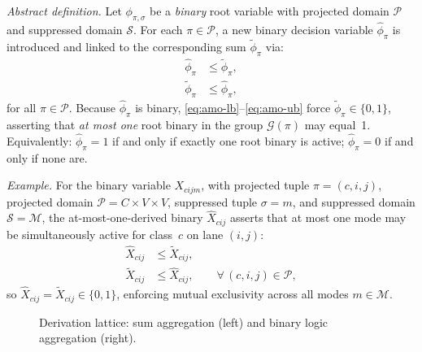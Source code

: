\begin{convention}
\smallskip
\noindent\textit{Abstract definition.}
Let $\phi_{\pi,\sigma}$ be a \emph{binary} root variable with projected
domain $\mathcal{P}$ and suppressed domain $\mathcal{S}$. For each
$\pi \in \mathcal{P}$, a new binary decision variable $\widehat{\phi}_{\pi}$
is introduced and linked to the corresponding sum $\widetilde{\phi}_{\pi}$
via:
\begin{align}
  \widehat{\phi}_{\pi} &\leq \widetilde{\phi}_{\pi},
    \label{eq:amo-lb}\\
  \widetilde{\phi}_{\pi} &\leq \widehat{\phi}_{\pi},
    \label{eq:amo-ub}
\end{align}
for all $\pi \in \mathcal{P}$. Because $\widehat{\phi}_{\pi}$ is binary,
\eqref{eq:amo-lb}--\eqref{eq:amo-ub} force $\widetilde{\phi}_{\pi} \in \{0,1\}$,
asserting that \emph{at most one} root binary in the group $\mathcal{G}(\pi)$
may equal~1. Equivalently: $\widehat{\phi}_{\pi} = 1$ if and only if exactly
one root binary is active; $\widehat{\phi}_{\pi} = 0$ if and only if none are.

\smallskip
\noindent\textit{Example.}
For the binary variable $X_{cijm}$, with projected tuple $\pi = (c,i,j)$,
projected domain $\mathcal{P} = C \times V \times V$, suppressed tuple
$\sigma = m$, and suppressed domain $\mathcal{S} = \mathcal{M}$, the
at-most-one-derived binary $\widehat{X}_{cij}$ asserts that at most one
mode may be simultaneously active for class~$c$ on lane $(i,j)$:
\begin{align*}
  \widehat{X}_{cij} &\leq \widetilde{X}_{cij}, \\
  \widetilde{X}_{cij} &\leq \widehat{X}_{cij},
  \qquad \forall\,(c,i,j) \in \mathcal{P},
\end{align*}
so $\widehat{X}_{cij} = \widetilde{X}_{cij} \in \{0,1\}$, enforcing mutual
exclusivity across all modes $m \in \mathcal{M}$.

\begin{figure}[H]
\centering
\resizebox{0.95\linewidth}{!}{%
  }
\caption{Derivation lattice: sum aggregation (left) and binary logic
  aggregation (right).}
\label{fig:index-lattice}
\end{figure}
\end{convention}
